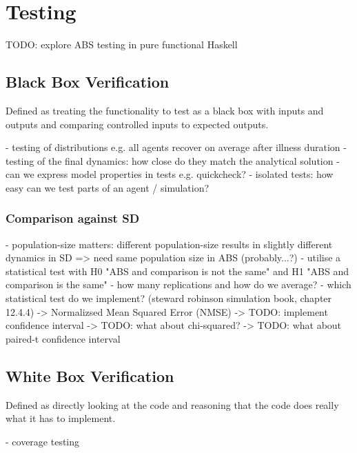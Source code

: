 \section{Testing}
TODO: explore ABS testing in pure functional Haskell


\subsection{Black Box Verification}
Defined as treating the functionality to test as a black box with inputs and outputs and comparing controlled inputs to expected outputs.

- testing of distributions e.g. all agents recover on average after illness duration
- testing of the final dynamics: how close do they match the analytical solution
- can we express model properties in tests e.g. quickcheck?
- isolated tests: how easy can we test parts of an agent / simulation?

\subsubsection{Comparison against SD}
- population-size matters: different population-size results in slightly different dynamics in SD => need same population size in ABS (probably...?)
- utilise a statistical test with H0 "ABS and comparison is not the same" and H1 "ABS and comparison is the same"
- how many replications and how do we average?
- which statistical test do we implement? (steward robinson simulation book, chapter 12.4.4)
	-> Normalizsed Mean Squared Error (NMSE)
	-> TODO: implement confidence interval 
	-> TODO: what about chi-squared?
	-> TODO: what about paired-t confidence interval
	
\subsection{White Box Verification}
Defined as directly looking at the code and reasoning that the code does really what it has to implement.

- coverage testing